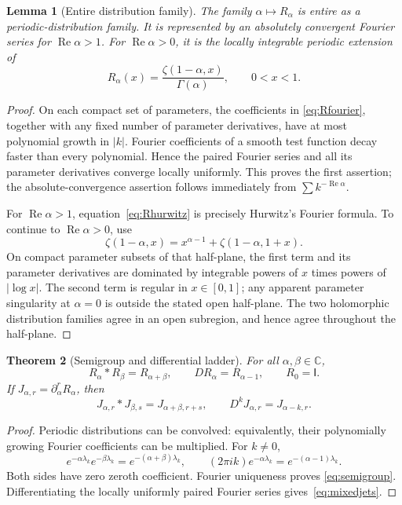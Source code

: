 \documentclass[11pt]{article}
\numberwithin{equation}{section}
\newtheorem{theorem}{Theorem}[section]
\newtheorem{lemma}[theorem]{Lemma}
\theoremstyle{definition}
\theoremstyle{remark}
\DeclareMathOperator{\Rea}{Re}
\newcommand{\C}{\mathbb C}
\newcommand{\Id}{\mathsf I}
\begin{document}
\begin{lemma}[Entire distribution family]\label{lem:entire}
The family $\alpha\mapsto R_\alpha$ is entire as a periodic-distribution
family. It is represented by an absolutely convergent Fourier series for
$\Rea\alpha>1$. For $\Rea\alpha>0$, it is the locally integrable periodic
extension of
\begin{equation}\label{eq:Rhurwitz}
 R_\alpha(x)=\frac{\zeta(1-\alpha,x)}{\Gamma(\alpha)},\qquad0<x<1.
\end{equation}
\end{lemma}
\begin{proof}
On each compact set of parameters, the coefficients in
\eqref{eq:Rfourier}, together with any fixed number of parameter derivatives,
have at most polynomial growth in $|k|$. Fourier coefficients of a smooth
test function decay faster than every polynomial. Hence the paired Fourier
series and all its parameter derivatives converge locally uniformly. This
proves the first assertion; the absolute-convergence assertion follows
immediately from $\sum k^{-\Rea\alpha}$.

For $\Rea\alpha>1$, equation~\eqref{eq:Rhurwitz} is precisely Hurwitz's
Fourier formula. To continue to $\Rea\alpha>0$, use
\[
 \zeta(1-\alpha,x)=x^{\alpha-1}+\zeta(1-\alpha,1+x).
\]
On compact parameter subsets of that half-plane, the first term and its
parameter derivatives are dominated by integrable powers of $x$ times
powers of $|\log x|$. The second term is regular in $x\in[0,1]$; any
apparent parameter singularity at $\alpha=0$ is outside the stated open
half-plane. The two holomorphic distribution families agree in an open
subregion, and hence agree throughout the half-plane.
\end{proof}

\begin{theorem}[Semigroup and differential ladder]\label{thm:semigroup}
For all $\alpha,\beta\in\C$,
\begin{equation}\label{eq:semigroup}
 R_\alpha*R_\beta=R_{\alpha+\beta},\qquad
 DR_\alpha=R_{\alpha-1},\qquad R_0=\Id.
\end{equation}
If $J_{\alpha,r}=\partial_\alpha^rR_\alpha$, then
\begin{equation}\label{eq:mixedjets}
 J_{\alpha,r}*J_{\beta,s}=J_{\alpha+\beta,r+s},\qquad
 D^kJ_{\alpha,r}=J_{\alpha-k,r}.
\end{equation}
\end{theorem}
\begin{proof}
Periodic distributions can be convolved: equivalently, their
polynomially growing Fourier coefficients can be multiplied. For $k\ne0$,
\[
 e^{-\alpha\lambda_k}e^{-\beta\lambda_k}
 =e^{-(\alpha+\beta)\lambda_k},\qquad
 (2\pi i k)e^{-\alpha\lambda_k}=e^{-(\alpha-1)\lambda_k}.
\]
Both sides have zero zeroth coefficient. Fourier uniqueness proves
\eqref{eq:semigroup}. Differentiating the locally uniformly paired
Fourier series gives~\eqref{eq:mixedjets}.
\end{proof}
\end{document}
